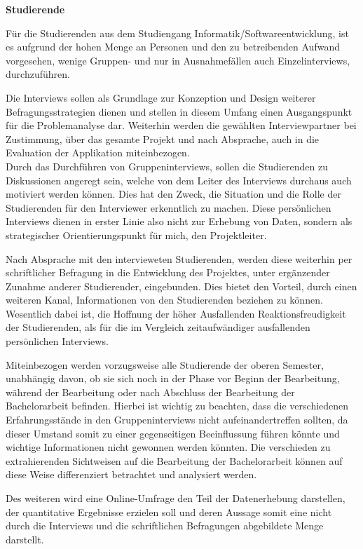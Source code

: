 \documentclass{scrreprt}
\begin{document}
\textbf{Studierende}
\par Für die Studierenden aus dem Studiengang Informatik/Softwareentwicklung, ist es aufgrund der hohen Menge an Personen und den zu betreibenden Aufwand vorgesehen, wenige Gruppen- und nur in Ausnahmefällen auch Einzelinterviews, durchzuführen. 
\par Die Interviews sollen als Grundlage zur Konzeption und Design weiterer Befragungsstrategien dienen und stellen in diesem Umfang einen Ausgangspunkt für die Problemanalyse dar. Weiterhin werden die gewählten Interviewpartner bei Zustimmung, über das gesamte Projekt und nach Absprache, auch in die Evaluation der Applikation miteinbezogen.\\
Durch das Durchführen von Gruppeninterviews, sollen die Studierenden zu Diskussionen angeregt sein, welche von dem Leiter des Interviews durchaus auch motiviert werden können. Dies hat den Zweck, die Situation und die Rolle der Studierenden für den Interviewer erkenntlich zu machen.  Diese persönlichen Interviews dienen in erster Linie also nicht zur Erhebung von Daten, sondern als strategischer Orientierungspunkt für mich, den Projektleiter.
\par Nach Absprache mit den intervieweten Studierenden, werden diese weiterhin per schriftlicher Befragung in die Entwicklung des Projektes, unter ergänzender Zunahme anderer Studierender, eingebunden. Dies bietet den Vorteil, durch einen weiteren Kanal, Informationen von den Studierenden beziehen zu können. Wesentlich dabei ist, die Hoffnung der höher Ausfallenden Reaktionsfreudigkeit der Studierenden, als für die im Vergleich zeitaufwändiger ausfallenden persönlichen Interviews.
\par Miteinbezogen werden vorzugsweise alle Studierende der oberen Semester, unabhängig davon, ob sie sich noch in der Phase vor Beginn der Bearbeitung, während der Bearbeitung oder nach Abschluss der Bearbeitung der Bachelorarbeit befinden. Hierbei ist wichtig zu beachten, dass die verschiedenen Erfahrungsstände in den Gruppeninterviews nicht aufeinandertreffen sollten, da dieser Umstand somit zu einer gegenseitigen Beeinflussung führen könnte und wichtige Informationen nicht gewonnen werden könnten. Die verschieden zu extrahierenden Sichtweisen auf die Bearbeitung der Bachelorarbeit können auf diese Weise differenziert betrachtet und analysiert werden.
\par Des weiteren wird eine Online-Umfrage den Teil der Datenerhebung darstellen, der quantitative Ergebnisse erzielen soll und deren Aussage somit eine nicht durch die Interviews und die schriftlichen Befragungen abgebildete Menge darstellt.
\end{document}
